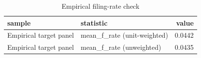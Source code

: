 \begin{table}

\caption{Empirical filing-rate check}
\centering
\begin{tabular}[t]{llr}
\toprule
sample & statistic & value\\
\midrule
Empirical target panel & mean\_f\_rate (unit-weighted) & 0.0442\\
Empirical target panel & mean\_f\_rate (unweighted) & 0.0435\\
\bottomrule
\end{tabular}
\end{table}
